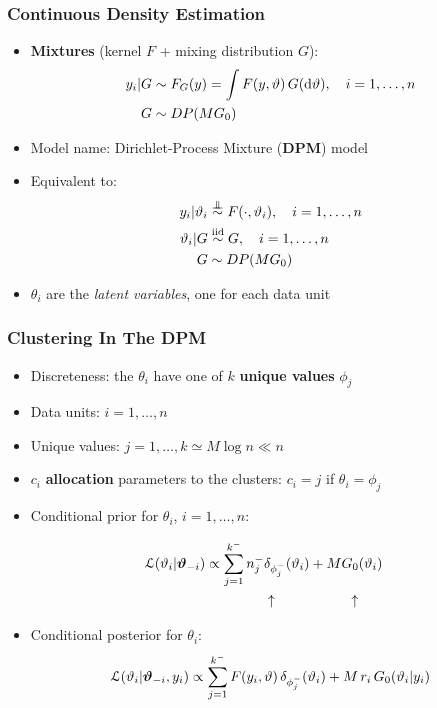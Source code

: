 \begin{frame}
	\frametitle{Continuous Density Estimation}
	\begin{itemize}
		\item \textbf{Mixtures} (kernel $F$ + mixing distribution $G$):
		\begin{align*}
			y_i | G &\sim F_G(y) = \int F(y,\vartheta) \, G(\mathrm d\vartheta), \quad i=1,\dots,n \\
			G &\sim DP(M G_0)
		\end{align*}
		\vspace{-10pt}
		\item Model name: Dirichlet-Process Mixture (\textbf{DPM}) model
		\item Equivalent to:
		\begin{align*}
			y_i | \theta_i &\indsim F(\cdot,\theta_i), \quad i=1,\dots,n \\
			\theta_i | G &\iidsim G, \quad i=1,\dots,n \\
			G &\sim DP(M G_0)
		\end{align*}
		\item $\theta_i$ are the \textit{latent variables}, one for each data unit
	\end{itemize}
\end{frame}


\begin{frame}
	\frametitle{Clustering In The DPM}
	\begin{itemize}
		\item Discreteness: the $\theta_i$ have one of $k$ \textbf{unique values} $\phi_j$ %
		\item Data units: $i=1,\dots,n$ \\
		\item Unique values: $j=1,\dots,k \simeq M \log n \ll n$
		\item $c_i$ \textbf{allocation} parameters to the clusters: $c_i = j$ if $\theta_i = \phi_j$
		\pause
		\item Conditional prior for $\theta_i$, $i=1,\dots,n$:
		\vspace{-5pt}
			\begin{minipage}{0.3\textwidth}
				\begin{align*}
					\hspace{-10pt}
					\Lc(\theta_i | \boldsymbol\theta_{-i}) \propto
					\sum_{j=1}^{k^-} n^-_j &\delta_{\phi^-_j} (\theta_i) + M G_0 (\theta_i) \\
					&\uparrow \hspace{55pt} \uparrow
				\end{align*}
			\end{minipage}%
			\begin{minipage}{0.5\textwidth}
				
			\end{minipage}
		\vspace{-5pt}
		\item Conditional posterior for $\theta_i$:
		$$ \mathcal L(\vartheta_i | \boldsymbol{\vartheta}_{-i}, y_i) \propto
		\sum_{j=1}^{k^-} F(y_i,\vartheta) \, \delta_{\phi^-_j} (\vartheta_i) + M \, r_i \, G_0(\vartheta_i | y_i) $$ %
	\end{itemize}
\end{frame}


